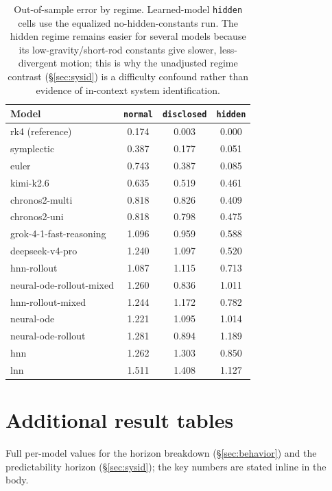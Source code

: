 \documentclass{article}
\begin{document}
\begin{table}[tbp]
\centering\small
\caption{Out-of-sample error by regime. Learned-model \texttt{hidden} cells use the
equalized no-hidden-constants run. The hidden regime remains easier for several models
because its low-gravity/short-rod constants give slower, less-divergent motion; this is why
the unadjusted regime contrast (\S\ref{sec:sysid}) is a difficulty confound rather than
evidence of in-context system identification.}
\label{tab:perregime}
\begin{tabular}{lccc}
\toprule
Model & \texttt{normal} & \texttt{disclosed} & \texttt{hidden} \\
\midrule
rk4 (reference) & 0.174 & 0.003 & 0.000 \\
symplectic & 0.387 & 0.177 & 0.051 \\
euler & 0.743 & 0.387 & 0.085 \\
kimi-k2.6 & 0.635 & 0.519 & 0.461 \\
chronos2-multi & 0.818 & 0.826 & 0.409 \\
chronos2-uni & 0.818 & 0.798 & 0.475 \\
grok-4-1-fast-reasoning & 1.096 & 0.959 & 0.588 \\
deepseek-v4-pro & 1.240 & 1.097 & 0.520 \\
hnn-rollout & 1.087 & 1.115 & 0.713 \\
neural-ode-rollout-mixed & 1.260 & 0.836 & 1.011 \\
hnn-rollout-mixed & 1.244 & 1.172 & 0.782 \\
neural-ode & 1.221 & 1.095 & 1.014 \\
neural-ode-rollout & 1.281 & 0.894 & 1.189 \\
hnn & 1.262 & 1.303 & 0.850 \\
lnn & 1.511 & 1.408 & 1.127 \\
\bottomrule
\end{tabular}
\end{table}

\section{Additional result tables}
\label{app:extra}
Full per-model values for the horizon breakdown (\S\ref{sec:behavior}) and the predictability
horizon (\S\ref{sec:sysid}); the key numbers are stated inline in the body.
\end{document}
